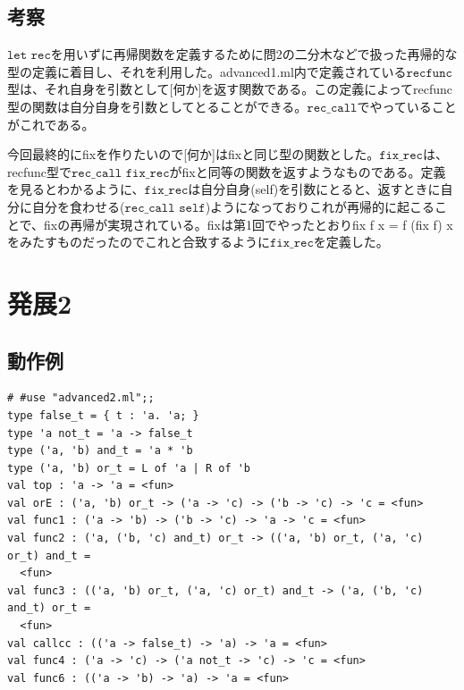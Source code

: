 \documentclass[11pt,a4paper]{jsarticle}
\begin{document}
\subsection*{考察}
$\texttt{let rec}$を用いずに再帰関数を定義するために問2の二分木などで扱った再帰的な型の定義に着目し、それを利用した。advanced1.ml内で定義されている$\texttt{recfunc}$型は、それ自身を引数として[何か]を返す関数である。この定義によってrecfunc型の関数は自分自身を引数としてとることができる。$\texttt{rec\_call}$でやっていることがこれである。\par
今回最終的にfixを作りたいので[何か]はfixと同じ型の関数とした。$\texttt{fix\_rec}$は、recfunc型で$\texttt{rec\_call\ fix\_rec}$がfixと同等の関数を返すようなものである。定義を見るとわかるように、$\texttt{fix\_rec}$は自分自身(self)を引数にとると、返すときに自分に自分を食わせる($\texttt{rec\_call\ self}$)ようになっておりこれが再帰的に起こることで、fixの再帰が実現されている。fixは第1回でやったとおりfix f x = f (fix f) xをみたすものだったのでこれと合致するように$\texttt{fix\_rec}$を定義した。
\section*{発展2}
\subsection*{動作例}
\begin{lstlisting}[basicstyle=\ttfamily\footnotesize, frame=single]
# #use "advanced2.ml";;
type false_t = { t : 'a. 'a; }
type 'a not_t = 'a -> false_t
type ('a, 'b) and_t = 'a * 'b
type ('a, 'b) or_t = L of 'a | R of 'b
val top : 'a -> 'a = <fun>
val orE : ('a, 'b) or_t -> ('a -> 'c) -> ('b -> 'c) -> 'c = <fun>
val func1 : ('a -> 'b) -> ('b -> 'c) -> 'a -> 'c = <fun>
val func2 : ('a, ('b, 'c) and_t) or_t -> (('a, 'b) or_t, ('a, 'c) or_t) and_t =
  <fun>
val func3 : (('a, 'b) or_t, ('a, 'c) or_t) and_t -> ('a, ('b, 'c) and_t) or_t =
  <fun>
val callcc : (('a -> false_t) -> 'a) -> 'a = <fun>
val func4 : ('a -> 'c) -> ('a not_t -> 'c) -> 'c = <fun>
val func6 : (('a -> 'b) -> 'a) -> 'a = <fun>
\end{lstlisting}
\end{document}

